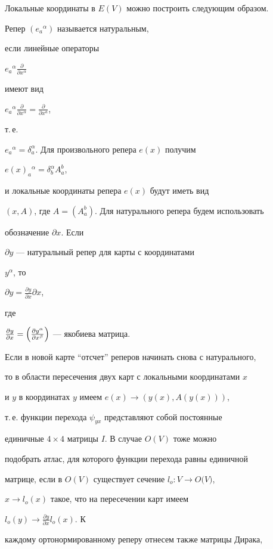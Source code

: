 Локальные координаты в $E(V)$ можно построить следующим образом.


Репер $(e_a{}^\alpha)$ называется натуральным,


если линейные операторы


$e_a{}^\alpha\frac{\partial}{\partial x^\alpha}$


имеют вид


$e_a{}^\alpha\frac{\partial}{\partial x^\alpha}=


\frac{\partial}{\partial x^a}$,


т.\,е.


$e_a{}^\alpha=\delta^\alpha_a$. Для произвольного репера $e(x)$ получим


$e(x)_a{}^\alpha=\delta^\alpha_b A^b_a$,


и локальные координаты репера $e(x)$ будут иметь вид


$(x,A)$, где $A=(A^b_a)$. Для натурального репера будем использовать


обозначение $\partial x$. Если


$\partial y$ --- натуральный репер для карты с координатами


$y^\alpha$, то


$\partial y=\frac{\partial y}{\partial x}\partial x$,


где


$\frac{\partial y}{\partial x}=\Bigl( \frac{\partial y^\alpha}


{\partial x^\beta}\Bigr)$ --- якобиева матрица.


Если в новой карте ``отсчет'' реперов начинать снова с натурального,


то в области пересечения двух карт с локальными координатами $x$


и $y$ в координатах $y$ имеем $e(x)\rightarrow(y(x),A(y(x)))$,


т.\,е. функции перехода $\psi_{yx}$ представляют собой постоянные


единичные $4\times4$ матрицы $I$. В случае $O(V)$ тоже можно


подобрать атлас, для которого функции перехода равны единичной


матрице, если в $O(V)$ существует сечение $l_o:V\rightarrow{O(V})$,


$x\rightarrow{l_o(x)}$ такое, что на пересечении карт имеем


$l_o(y)\rightarrow{\frac{\partial y}{\partial x}l_o(x)}$. К


каждому ортонормированному реперу отнесем также матрицы Дирака,


